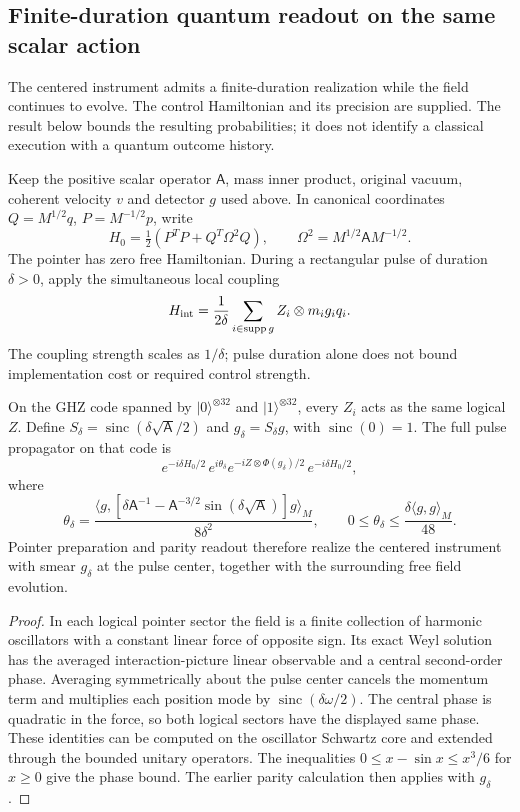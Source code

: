 \subsection{Finite-duration quantum readout on the same scalar action}
\label{sec:source-scalar-finite-instrument}

The centered instrument admits a finite-duration realization while the field
continues to evolve. The control Hamiltonian and its precision are supplied.
The result below bounds the resulting probabilities; it does not identify a
classical execution with a quantum outcome history.

Keep the positive scalar operator $\mathsf A$, mass inner product, original
vacuum, coherent velocity $v$ and detector $g$ used above. In canonical
coordinates $Q=M^{1/2}q$, $P=M^{-1/2}p$, write
\[
 H_0=\tfrac12(P^TP+Q^T\Omega^2Q),\qquad
 \Omega^2=M^{1/2}\mathsf A M^{-1/2}.
\]
The pointer has zero free Hamiltonian. During a rectangular pulse of duration
$\delta>0$, apply the simultaneous local coupling
\[
 H_{\rm int}=\frac1{2\delta}\sum_{i\in\operatorname{supp}g}
 Z_i\otimes m_i g_iq_i.
\]
The coupling strength scales as $1/\delta$; pulse duration alone does not
bound implementation cost or required control strength.

\begin{proposition}
\label{prop:source-scalar-finite-pulse}
On the GHZ code spanned by $|0\rangle^{\otimes32}$ and
$|1\rangle^{\otimes32}$, every $Z_i$ acts as the same logical $Z$.
Define $S_\delta=\operatorname{sinc}(\delta\sqrt{\mathsf A}/2)$ and
$g_\delta=S_\delta g$, with $\operatorname{sinc}(0)=1$. The full pulse
propagator on that code is
\[
 e^{-i\delta H_0/2}\,e^{i\theta_\delta}
 e^{-iZ\otimes\Phi(g_\delta)/2}\,e^{-i\delta H_0/2},
\]
where
\[
 \theta_\delta=
 \frac{\langle g,[\delta\mathsf A^{-1}
 -\mathsf A^{-3/2}\sin(\delta\sqrt{\mathsf A})]g\rangle_M}{8\delta^2},
 \qquad 0\le\theta_\delta\le\frac{\delta\langle g,g\rangle_M}{48}.
\]
Pointer preparation and parity readout therefore realize the centered
instrument with smear $g_\delta$ at the pulse center, together with the
surrounding free field evolution.
\end{proposition}
\begin{proof}
In each logical pointer sector the field is a finite collection of harmonic
oscillators with a constant linear force of opposite sign. Its exact Weyl
solution has the averaged interaction-picture linear observable and a central
second-order phase. Averaging symmetrically about the pulse center cancels
the momentum term and multiplies each position mode by
$\operatorname{sinc}(\delta\omega/2)$. The central phase is quadratic in
the force, so both logical sectors have the displayed same phase. These
identities can be computed on the oscillator Schwartz core and extended
through the bounded unitary operators. The inequalities
$0\le x-\sin x\le x^3/6$ for $x\ge0$ give the phase bound.
The earlier parity calculation then applies with $g_\delta$.
\end{proof}

